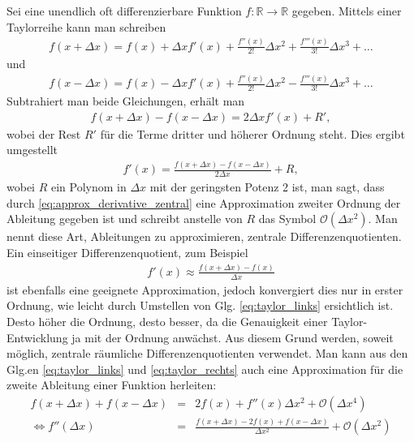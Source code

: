 \documentclass{book}
\begin{document}
Sei eine unendlich oft differenzierbare Funktion $f:\mathbb{R}\to\mathbb{R}$ gegeben. Mittels einer Taylorreihe kann man schreiben
%
\begin{eqnarray}
f\left(x + \Delta x\right) = f\left(x\right) + \Delta xf'\left(x\right) + \frac{f''\left(x\right)}{2!}\Delta x^2 + \frac{f'''\left(x\right)}{3!}\Delta x^3 + \dotsc\label{eq:taylor_links}
\end{eqnarray}
%
und
%
\begin{eqnarray}
f\left(x - \Delta x\right) = f\left(x\right) - \Delta xf'\left(x\right) + \frac{f''\left(x\right)}{2!}\Delta x^2 - \frac{f'''\left(x\right)}{3!}\Delta x^3 + \dotsc\label{eq:taylor_rechts}
\end{eqnarray}
%
Subtrahiert man beide Gleichungen, erhält man
%
\begin{eqnarray}
f\left(x + \Delta x\right) - f\left(x - \Delta x\right) = 2\Delta xf'\left(x\right) + R', 
\end{eqnarray}
%
wobei der Rest $R'$ für die Terme dritter und höherer Ordnung steht. Dies ergibt umgestellt
%
\begin{eqnarray}
f'\left(x\right) = \frac{f\left(x + \Delta x\right) - f\left(x - \Delta x\right)}{2\Delta x} + R, \label{eq:approx_derivative_zentral}
\end{eqnarray}
%
wobei $R$ ein Polynom in $\Delta x$ mit der geringsten Potenz 2 ist, man sagt, dass durch \eqref{eq:approx_derivative_zentral} eine Approximation zweiter Ordnung der Ableitung gegeben ist und schreibt anstelle von $R$ das Symbol $\mathcal{O}\left(\Delta x^2\right)$. Man nennt diese Art, Ableitungen zu approximieren, zentrale Differenzenquotienten. Ein einseitiger Differenzenquotient, zum Beispiel
%
\begin{eqnarray}
f'\left(x\right) \approx\frac{f\left(x + \Delta x\right) - f\left(x\right)}{\Delta x}
\end{eqnarray}
%
ist ebenfalls eine geeignete Approximation, jedoch konvergiert dies nur in erster Ordnung, wie leicht durch Umstellen von Glg. \eqref{eq:taylor_links} ersichtlich ist. Desto höher die Ordnung, desto besser, da die Genauigkeit einer Taylor-Entwicklung ja mit der Ordnung anwächst. Aus diesem Grund werden, soweit möglich, zentrale räumliche Differenzenquotienten verwendet. Man kann aus den Glg.en \eqref{eq:taylor_links} und \eqref{eq:taylor_rechts} auch eine Approximation für die zweite Ableitung einer Funktion herleiten:
%
\begin{eqnarray}
f\left(x + \Delta x\right) + f\left(x - \Delta x\right)& = & 2f\left(x\right) + f''\left(x\right)\Delta x^2 + \mathcal{O}\left(\Delta x^4\right)\nonumber\\
\Leftrightarrow f''\left(\Delta x\right) & = & \frac{f\left(x + \Delta x\right) - 2f\left(x\right) + f\left(x - \Delta x\right)}{\Delta x^2} + \mathcal{O}\left(\Delta x^2\right)
\end{eqnarray}
\end{document}
